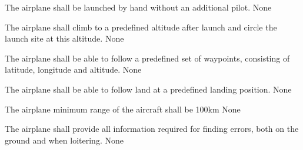 
{The airplane shall be launched by hand without an additional pilot.}
{}
{None}

{The airplane shall climb to a predefined altitude after launch and circle the launch site at this altitude.}
{}
{None}

{The airplane shall be able to follow a predefined set of waypoints, consisting of latitude, longitude and altitude.}
{}
{None}

{The airplane shall be able to follow land at a predefined landing position.}
{}
{None}

{The airplane minimum range of the aircraft shall be 100km}
{}
{None}

{The airplane shall provide all information required for finding errors, both on the ground and when loitering.}
{}
{None}

